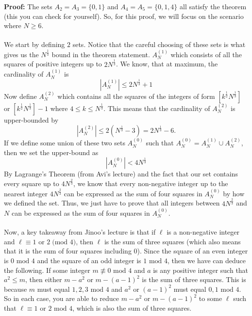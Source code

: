 \documentclass[8pt]{extarticle}
\begin{document}
\begin{boxedsection}
    \textbf{Proof:} The sets $A_2 = A_3 = \{0, 1\}$ and $A_4 = A_5 = \{0,1,4\}$ all satisfy the theorem (this you can check for yourself). So, for this proof, we will focus on the scenario where $N \geq 6$. \\
    \\
    We start by defining $2$ sets. Notice that the careful choosing of these sets is what gives us the $N^{\frac{1}{3}}$ bound in the theorem statement. $A_N^{(1)}$ which consists of all the squares of positive integers up to $2N^{\frac{1}{3}}$. We know, that at maximum, the cardinality of $A_N^{(1)}$ is
    $$
    |A_N^{(1)}| \leq 2N^{\frac{1}{3}} + 1
    $$
Now define $A^{(2)}_N$ which contains all the squares of the integers of form $\left[k^{\frac{1}{2}}N^{\frac{1}{3}}\right]$ or $\left[k^{\frac{1}{2}}N^{\frac{1}{3}}\right] - 1$ where $4 \leq k \leq N^{\frac{1}{3}}$. This means that the cardinality of $A^{(2)}_N$ is upper-bounded by
    $$
    |A^{(2)}_N| \leq 2(N^{\frac{1}{3}} - 3) = 2N^{\frac{1}{3}} - 6. 
    $$
    If we define some union of these two sets $A^{(0)}_N$ such that $A^{(0)}_N = A^{(1)}_N \cup A^{(2)}_N$, then we set the upper-bound as
$$
    |A^{(0)}_N| < 4N^{\frac{1}{3}}
$$
By Lagrange's Theorem (from Avi's lecture) and the fact that our set contains every square up to $4N^{\frac{2}{3}}$, we know that every non-negative integer up to the nearest integer $4N^{\frac{2}{3}}$ can be expressed as the sum of four squares in $A_N^{(0)}$ by how we defined the set. Thus, we just have to prove that all integers between $4N^{\frac{2}{3}}$ and $N$ can be expressed as the sum of four squares in $A_N^{(0)}$.\\
\\
Now, a key takeaway from Jinoo's lecture is that if $\ell$ is a non-negative integer and $\ell \equiv 1 \text{ or } 2 \;\text{(mod 4)}$, then $\ell$ is the sum of three squares (which also means that it is the sum of four squares including $0$). Since the square of an even integer is $0 \text{ mod } 4$ and the square of an odd integer is $1 \text{ mod } 4$, then we have can deduce the following. If some integer $m \nequiv 0 \text{ mod } 4$ and $a$ is any positive integer such that $a^2 \leq m$, then either $m-a^2$ or $m-(a-1)^2$ is the sum of three squares. This is because $m$ must equal $1,2,3 \text{ mod }4$ and $a^2$ or $(a-1)^2$ must equal $0,1 \text{ mod } 4$. So in each case, you are able to reduce $m-a^2$ or $m-(a-1)^2$ to some $\ell$ such that $\ell \equiv 1 \text{ or } 2 \text{ mod } 4$, which is also the sum of three squares.\\

\end{boxedsection}
\end{document}
